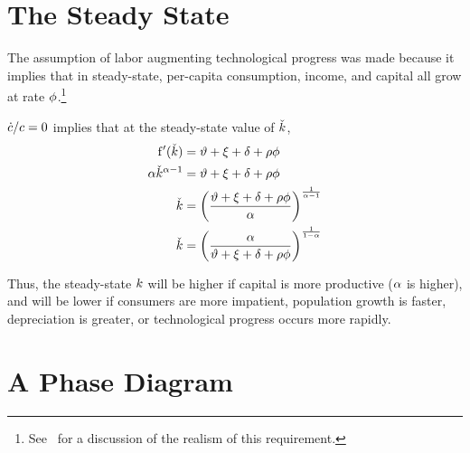 \documentclass{handout}
\begin{document}
\section{The Steady State}

The assumption of labor augmenting technological progress was made 
because it implies that in steady-state, per-capita consumption, income,
and capital all grow at rate $\phi$.\footnote{See~\cite{ghosDespiteUzawa} for a discussion of the realism of this requirement.}

$\dot{c}/c = 0$ implies that at the steady-state value of $\check{{k}}$,
\begin{equation}\begin{gathered}\begin{aligned}
  \mathrm{f}^{\prime}(\check{{k}}) & =  \vartheta +\xi+\delta+\rho \phi  \\
  \alpha \check{{k}}^{\alpha-1} & =  \vartheta +\xi+\delta+\rho \phi  \\
  \check{{k}} & =  \left(\frac{\vartheta +\xi+\delta+\rho \phi}{\alpha}\right)^{\frac{1}{\alpha-1}}
  \\      \check{{k}} & =  \left(\frac{\alpha}{\vartheta +\xi+\delta+\rho \phi}\right)^{\frac{1}{1-\alpha}}   
\end{aligned}\end{gathered}\end{equation}

Thus, the steady-state ${k}$ will be higher if capital 
is more productive ($\alpha$ is higher), and will be lower if 
consumers are more impatient, population growth is faster, 
depreciation is greater, or technological progress occurs more rapidly.

\section{A Phase Diagram}
\end{document}
